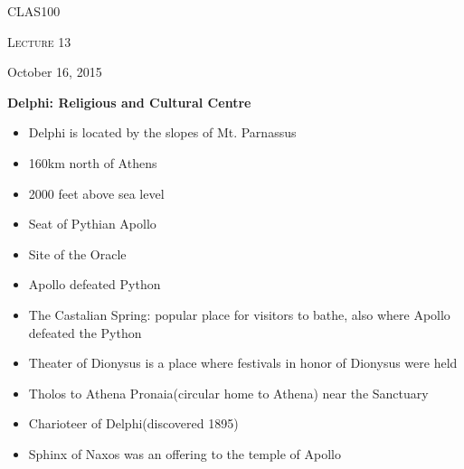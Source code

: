 \documentclass[12pt,a4paper]{report}
\begin{document}
	\centering
	{\scshape\LARGE CLAS100 \par}
	{\scshape\Large Lecture 13\par}
	{\large October 16, 2015}
	\vspace{1.5cm}

\textbf{Delphi: Religious and Cultural Centre}
\begin{itemize}
\item Delphi is located by the slopes of Mt. Parnassus
\item 160km north of Athens
\item 2000 feet above sea level
\item Seat of Pythian Apollo
\item Site of the Oracle
\item Apollo defeated Python
\item The Castalian Spring: popular place for visitors to bathe, also where Apollo defeated the Python
\item Theater of Dionysus is a place where festivals in honor of Dionysus were held
\item Tholos to Athena Pronaia(circular home to Athena) near the Sanctuary
\item Charioteer of Delphi(discovered 1895)
\item Sphinx of Naxos was an offering to the temple of Apollo
\end{itemize}
\end{document}
